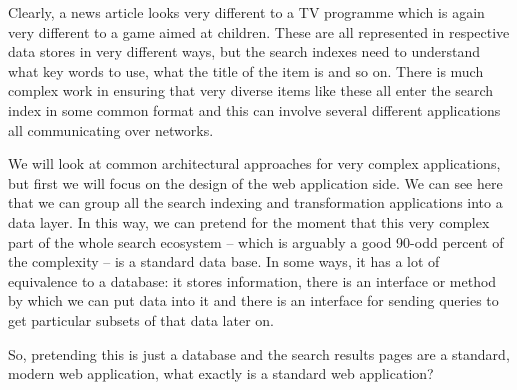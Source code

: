 \documentclass{beamer}
\begin{document}
{  Clearly, a news article looks very different to a TV programme which is again very different
  to a game aimed at children. These are all represented in respective data stores in
  very different ways, but the search indexes need to understand what key words to use,
  what the title of the item is and so on. There is much complex work in ensuring that very diverse
  items like these all enter the search index in some common format and this can involve
  several different applications all communicating over networks.

  We will look at common architectural approaches for very complex applications, but first we will
  focus on the design of the web application side. We can see here that we can group all
  the search indexing and transformation applications into a data layer. In this way, we can
  pretend for the moment that this very complex part of the whole search ecosystem -- which is
  arguably a good 90-odd percent of the complexity -- is a standard data base. In some ways,
  it has a lot of equivalence to a database: it stores information, there is an interface or
  method by which we can put data into it and there is an interface for sending queries
  to get particular subsets of that data later on.

  So, pretending this is just a database and the search results pages are a standard, modern
  web application, what exactly is a standard web application?
}

\end{document}
